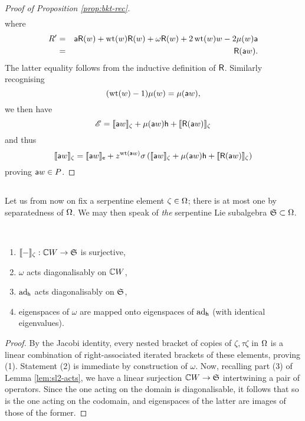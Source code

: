 \begin{proof}[Proof of Proposition \ref{prop:bkt-rec}]
\begin{eqnarray*}
\end{eqnarray*}
where
\begin{eqnarray*}
        R' &=& \mathsf{a}\mathsf{R}(w)+\operatorname{\mathrm{wt}}(w)\mathsf{R}(w)+\omega\mathsf{R}(w)+2\operatorname{\mathrm{wt}}(w)w-2\mu(w)\mathsf{a} \\
           &=& \mathsf{R}(\mathsf{a} w).
\end{eqnarray*}
The latter equality follows from the inductive definition of $\mathsf{R}$. Similarly recognising
\[(\operatorname{\mathrm{wt}}(w) - 1) \mu(w) = \mu(\mathsf{a} w),\] we then have
\[
        \mathscr{E} = \llbracket{\mathsf{a}w}\rrbracket_\zeta + \mu(\mathsf{a} w)\mathsf{h} + \llbracket{\mathsf{R}(\mathsf{a}w)}\rrbracket_\zeta
\]
and thus
\[
        \llbracket{\mathsf{a}w}\rrbracket_\zeta = \llbracket{\mathsf{a}w}\rrbracket_{\mathsf{e}} + z^{\operatorname{\mathrm{wt}}(\mathsf{a} w)} \sigma \left( \llbracket{\mathsf{a}w}\rrbracket_\zeta + \mu(\mathsf{a} w)\mathsf{h} + \llbracket{\mathsf{R}(\mathsf{a}w)}\rrbracket_\zeta \right)
\]
proving $\mathsf{a} w \in P$.
\end{proof}

\subsection{}
Let us from now on fix a serpentine element $\zeta\in\Omega$; there is at most one
by separatedness of $\Omega$. We may then speak of \emph{the} serpentine Lie subalgebra
$\mathfrak{S} \subset\Omega$.

\begin{lem}\label{lem:eigen}\
\begin{enumerate}
        \item $\llbracket{-}\rrbracket_\zeta:{{\mathbb{C}}{}W} \to \mathfrak{S}$ is surjective, 
        \item $\omega$ acts diagonalisably on ${{\mathbb{C}}{}W}$,
        \item $\operatorname{\mathrm{ad}}_{\mathsf{h}}$ acts diagonalisably on $\mathfrak{S}$,
        \item eigenspaces of $\omega$ are mapped onto eigenspaces of $\operatorname{\mathrm{ad}}_{\mathsf{h}}$ (with identical eigenvalues).
\end{enumerate}
\end{lem}
\begin{proof} By the Jacobi identity, every nested bracket of copies of $\zeta,\tau\zeta$ in $\Omega$
is a linear combination of right-associated iterated brackets of these elements,
proving (1). Statement (2) is immediate by construction of $\omega$. Now, recalling part (3) of Lemma \ref{lem:sl2-acts}, we have a
linear surjection ${{\mathbb{C}}{}W}\to\mathfrak{S}$ intertwining a pair of operators. Since the one acting on the
domain is diagonalisable, it follows that so is the one acting on the codomain, and
eigenspaces of the latter are images of those of the former.\end{proof}

